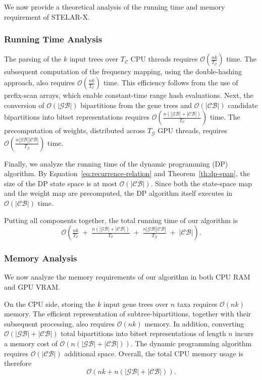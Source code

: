 \documentclass[runningheads]{llncs}
\begin{document}
We now provide a theoretical analysis of the running time and memory requirement of STELAR-X. 

\subsubsection{Running Time Analysis}

The parsing of the $k$ input trees over $T_\mathcal{C}$ CPU threads requires $\mathcal{O}\!\left(\tfrac{nk}{T_\mathcal{C}}\right)$ time. The subsequent computation of the frequency mapping, using the double-hashing approach, also requires $\mathcal{O}\!\left(\tfrac{nk}{T_\mathcal{C}}\right)$ time. This efficiency follows from the use of prefix-scan arrays, which enable constant-time range hash evaluations.  
Next, the conversion of $\mathcal{O}(|\mathcal{GB}|)$ bipartitions from the gene trees and $\mathcal{O}(|\mathcal{CB}|)$ candidate bipartitions into bitset representations requires $\mathcal{O}\!\left(\tfrac{n(|\mathcal{GB}|+|\mathcal{CB}|)}{T_\mathcal{C}}\right)$ time. The precomputation of weights, distributed across $T_\mathcal{G}$ GPU threads, requires $\mathcal{O}\!\left(\tfrac{n|\mathcal{GB}||\mathcal{CB}|}{T_\mathcal{G}}\right)$ time.  

Finally, we analyze the running time of the dynamic programming (DP) algorithm. By Equation~\eqref{eq:recurrence-relation} and Theorem~\ref{th:dp-span}, the size of the DP state space is at most $\mathcal{O}(|\mathcal{CB}|)$. Since both the state-space map and the weight map are precomputed, the DP algorithm itself executes in $\mathcal{O}(|\mathcal{CB}|)$ time.  

Putting all components together, the total running time of our algorithm is
\[
\mathcal{O}\!\left(
\tfrac{nk}{T_\mathcal{C}} \;+\;
\tfrac{n(|\mathcal{GB}|+|\mathcal{CB}|)}{T_\mathcal{C}} \;+\;
\tfrac{n|\mathcal{GB}||\mathcal{CB}|}{T_\mathcal{G}} \;+\;
|\mathcal{CB}|
\right).
\]


\subsubsection{Memory Analysis} 

We now analyze the memory requirements of our algorithm in both CPU RAM and GPU VRAM.  

On the CPU side, storing the $k$ input gene trees over $n$ taxa requires $\mathcal{O}(nk)$ memory. The efficient representation of subtree-bipartitions, together with their subsequent processing, also requires $\mathcal{O}(nk)$ memory. In addition, converting $\mathcal{O}(|\mathcal{GB}|+|\mathcal{CB}|)$ total bipartitions into bitset representations of length $n$ incurs a memory cost of $\mathcal{O}(n(|\mathcal{GB}|+|\mathcal{CB}|))$. The dynamic programming algorithm requires $\mathcal{O}(|\mathcal{CB}|)$ additional space. Overall, the total CPU memory usage is therefore
\[
\mathcal{O}\!\left(nk + n(|\mathcal{GB}|+|\mathcal{CB}|)\right).
\]
\end{document}
